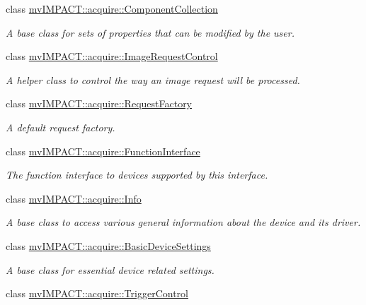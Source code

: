 \begin{DoxyCompactItemize}
class \hyperlink{classmv_i_m_p_a_c_t_1_1acquire_1_1_component_collection}{mv\+I\+M\+P\+A\+C\+T\+::acquire\+::\+Component\+Collection}
\begin{DoxyCompactList}\small\item\em A base class for sets of properties that can be modified by the user. \end{DoxyCompactList}\item 
class \hyperlink{classmv_i_m_p_a_c_t_1_1acquire_1_1_image_request_control}{mv\+I\+M\+P\+A\+C\+T\+::acquire\+::\+Image\+Request\+Control}
\begin{DoxyCompactList}\small\item\em A helper class to control the way an image request will be processed. \end{DoxyCompactList}\item 
class \hyperlink{classmv_i_m_p_a_c_t_1_1acquire_1_1_request_factory}{mv\+I\+M\+P\+A\+C\+T\+::acquire\+::\+Request\+Factory}
\begin{DoxyCompactList}\small\item\em A default request factory. \end{DoxyCompactList}\item 
class \hyperlink{classmv_i_m_p_a_c_t_1_1acquire_1_1_function_interface}{mv\+I\+M\+P\+A\+C\+T\+::acquire\+::\+Function\+Interface}
\begin{DoxyCompactList}\small\item\em The function interface to devices supported by this interface. \end{DoxyCompactList}\item 
class \hyperlink{classmv_i_m_p_a_c_t_1_1acquire_1_1_info}{mv\+I\+M\+P\+A\+C\+T\+::acquire\+::\+Info}
\begin{DoxyCompactList}\small\item\em A base class to access various general information about the device and its driver. \end{DoxyCompactList}\item 
class \hyperlink{classmv_i_m_p_a_c_t_1_1acquire_1_1_basic_device_settings}{mv\+I\+M\+P\+A\+C\+T\+::acquire\+::\+Basic\+Device\+Settings}
\begin{DoxyCompactList}\small\item\em A base class for essential device related settings. \end{DoxyCompactList}\item 
class \hyperlink{classmv_i_m_p_a_c_t_1_1acquire_1_1_trigger_control}{mv\+I\+M\+P\+A\+C\+T\+::acquire\+::\+Trigger\+Control}

\end{DoxyCompactItemize}
